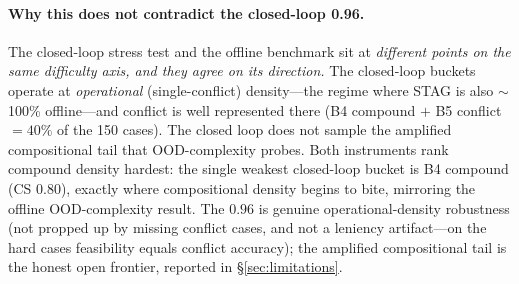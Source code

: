 \paragraph{Why this does not contradict the closed-loop 0.96.}
The closed-loop stress test and the offline benchmark sit at \emph{different points on the same difficulty
axis, and they agree on its direction.} The closed-loop buckets operate at \emph{operational}
(single-conflict) density---the regime where STAG is also $\sim$100\% offline---and conflict is well
represented there (B4 compound $+$ B5 conflict $=40\%$ of the 150 cases). The closed loop does not sample
the amplified compositional tail that OOD-complexity probes. Both instruments rank compound density
hardest: the single weakest closed-loop bucket is B4 compound (CS $0.80$), exactly where compositional
density begins to bite, mirroring the offline OOD-complexity result. The $0.96$ is genuine
operational-density robustness (not propped up by missing conflict cases, and not a leniency artifact---on
the hard cases feasibility equals conflict accuracy); the amplified compositional tail is the honest open
frontier, reported in \S\ref{sec:limitations}.

